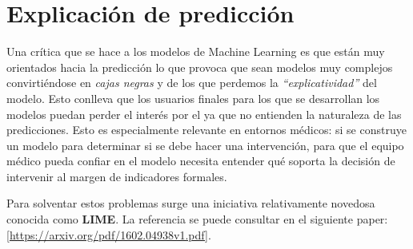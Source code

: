 \documentclass[]{book}
\newenvironment{Shaded}{\begin{snugshade}}{\end{snugshade}}
\newcommand{\DataTypeTok}[1]{\textcolor[rgb]{0.13,0.29,0.53}{#1}}
\newcommand{\DecValTok}[1]{\textcolor[rgb]{0.00,0.00,0.81}{#1}}
\newcommand{\KeywordTok}[1]{\textcolor[rgb]{0.13,0.29,0.53}{\textbf{#1}}}
\newcommand{\NormalTok}[1]{#1}
\newcommand{\OperatorTok}[1]{\textcolor[rgb]{0.81,0.36,0.00}{\textbf{#1}}}
\newcommand{\StringTok}[1]{\textcolor[rgb]{0.31,0.60,0.02}{#1}}
\begin{document}
\begin{Shaded}
\end{Shaded}

\hypertarget{explicacion-de-prediccion}{%
\section{Explicación de predicción}\label{explicacion-de-prediccion}}

Una crítica que se hace a los modelos de Machine Learning es que están muy orientados hacia la predicción lo que provoca que sean modelos muy complejos convirtiéndose en \emph{cajas negras} y de los que perdemos la \emph{``explicatividad''} del modelo. Esto conlleva que los usuarios finales para los que se desarrollan los modelos puedan perder el interés por el ya que no entienden la naturaleza de las predicciones. Esto es especialmente relevante en entornos médicos: si se construye un modelo para determinar si se debe hacer una intervención, para que el equipo médico pueda confiar en el modelo necesita entender qué soporta la decisión de intervenir al margen de indicadores formales.

Para solventar estos problemas surge una iniciativa relativamente novedosa conocida como \textbf{LIME}. La referencia se puede consultar en el siguiente paper: {[}\url{https://arxiv.org/pdf/1602.04938v1.pdf}{]}.
\end{document}
